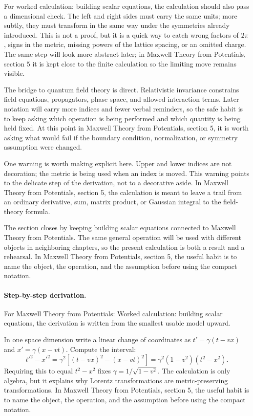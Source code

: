 For worked calculation: building scalar equations, the calculation should also pass a dimensional check.  The left and right sides must carry the same units; more subtly, they must transform in the same way under the symmetries already introduced.  This is not a proof, but it is a quick way to catch wrong factors of \(2\pi\), signs in the metric, missing powers of the lattice spacing, or an omitted charge.  The same step will look more abstract later; in Maxwell Theory from Potentials, section 5 it is kept close to the finite calculation so the limiting move remains visible.

The bridge to quantum field theory is direct.  Relativistic invariance constrains field equations, propagators, phase space, and allowed interaction terms.  Later notation will carry more indices and fewer verbal reminders, so the safe habit is to keep asking which operation is being performed and which quantity is being held fixed.  At this point in Maxwell Theory from Potentials, section 5, it is worth asking what would fail if the boundary condition, normalization, or symmetry assumption were changed.

One warning is worth making explicit here.  Upper and lower indices are not decoration; the metric is being used when an index is moved.  This warning points to the delicate step of the derivation, not to a decorative aside.  In Maxwell Theory from Potentials, section 5, the calculation is meant to leave a trail from an ordinary derivative, sum, matrix product, or Gaussian integral to the field-theory formula.

The section closes by keeping building scalar equations connected to Maxwell Theory from Potentials.  The same general operation will be used with different objects in neighboring chapters, so the present calculation is both a result and a rehearsal.  In Maxwell Theory from Potentials, section 5, the useful habit is to name the object, the operation, and the assumption before using the compact notation.



\paragraph{Step-by-step derivation.}

For Maxwell Theory from Potentials: Worked calculation: building scalar equations, the derivation is written from the smallest usable model upward.

In one space dimension write a linear change of coordinates as \(t'=\gamma(t-vx)\) and \(x'=\gamma(x-vt)\).  Compute the interval:
\[
  t'^2-x'^2
  =
  \gamma^2[(t-vx)^2-(x-vt)^2]
  =
  \gamma^2(1-v^2)(t^2-x^2).
\]
Requiring this to equal \(t^2-x^2\) fixes \(\gamma=1/\sqrt{1-v^2}\).  The calculation is only algebra, but it explains why Lorentz transformations are metric-preserving transformations.  In Maxwell Theory from Potentials, section 5, the useful habit is to name the object, the operation, and the assumption before using the compact notation.

